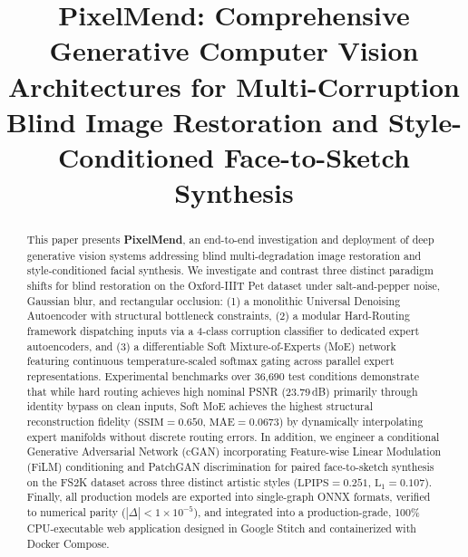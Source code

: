\documentclass[conference]{IEEEtran}
\begin{document}
\title{PixelMend: Comprehensive Generative Computer Vision Architectures for Multi-Corruption Blind Image Restoration and Style-Conditioned Face-to-Sketch Synthesis}

\author{
}

\maketitle

\begin{abstract}
This paper presents \textbf{PixelMend}, an end-to-end investigation and deployment of deep generative vision systems addressing blind multi-degradation image restoration and style-conditioned facial synthesis. We investigate and contrast three distinct paradigm shifts for blind restoration on the Oxford-IIIT Pet dataset under salt-and-pepper noise, Gaussian blur, and rectangular occlusion: (1) a monolithic Universal Denoising Autoencoder with structural bottleneck constraints, (2) a modular Hard-Routing framework dispatching inputs via a 4-class corruption classifier to dedicated expert autoencoders, and (3) a differentiable Soft Mixture-of-Experts (MoE) network featuring continuous temperature-scaled softmax gating across parallel expert representations. Experimental benchmarks over 36,690 test conditions demonstrate that while hard routing achieves high nominal PSNR ($23.79$\,dB) primarily through identity bypass on clean inputs, Soft MoE achieves the highest structural reconstruction fidelity ($\text{SSIM} = 0.650$, $\text{MAE} = 0.0673$) by dynamically interpolating expert manifolds without discrete routing errors. In addition, we engineer a conditional Generative Adversarial Network (cGAN) incorporating Feature-wise Linear Modulation (FiLM) conditioning and PatchGAN discrimination for paired face-to-sketch synthesis on the FS2K dataset across three distinct artistic styles ($\text{LPIPS} = 0.251$, $\text{L}_1 = 0.107$). Finally, all production models are exported into single-graph ONNX formats, verified to numerical parity ($|\Delta| < 1\times 10^{-5}$), and integrated into a production-grade, 100\% CPU-executable web application designed in Google Stitch and containerized with Docker Compose.
\end{abstract}
\end{document}
